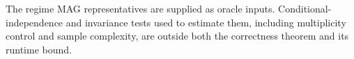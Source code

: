 The regime MAG representatives are supplied as oracle inputs.  Conditional-independence and invariance tests used to estimate them, including multiplicity control and sample complexity, are outside both the correctness theorem and its runtime bound.